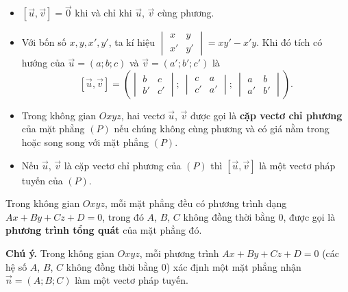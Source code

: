 \begin{chuy}
\begin{itemize}
  \item $[\vec u,\vec v]=\vec0$ khi và chỉ khi $\vec u$, $\vec v$ cùng phương.
  \item Với bốn số $x,y,x',y'$, ta kí hiệu $\begin{vmatrix}x&y\\x'&y'\end{vmatrix}=xy'-x'y$. Khi đó tích có hướng của $\vec u=(a;b;c)$ và $\vec v=(a';b';c')$ là
  \[[\vec u,\vec v]=\left(\begin{vmatrix}b&c\\b'&c'\end{vmatrix};\ \begin{vmatrix}c&a\\c'&a'\end{vmatrix};\ \begin{vmatrix}a&b\\a'&b'\end{vmatrix}\right).\]
\end{itemize}
\end{chuy}

\begin{dinhnghia}
\begin{itemize}
  \item Trong không gian $Oxyz$, hai vectơ $\vec u$, $\vec v$ được gọi là \textbf{cặp vectơ chỉ phương} của mặt phẳng $(P)$ nếu chúng không cùng phương và có giá nằm trong hoặc song song với mặt phẳng $(P)$.
  \item Nếu $\vec u$, $\vec v$ là cặp vectơ chỉ phương của $(P)$ thì $[\vec u,\vec v]$ là một vectơ pháp tuyến của $(P)$.
\end{itemize}
\end{dinhnghia}

\begin{dinhnghia}
Trong không gian $Oxyz$, mỗi mặt phẳng đều có phương trình dạng $Ax+By+Cz+D=0$, trong đó $A$, $B$, $C$ không đồng thời bằng $0$, được gọi là \textbf{phương trình tổng quát} của mặt phẳng đó.

\smallskip\textbf{\color{dcnhan}Chú ý.} Trong không gian $Oxyz$, mỗi phương trình $Ax+By+Cz+D=0$ (các hệ số $A$, $B$, $C$ không đồng thời bằng $0$) xác định một mặt phẳng nhận $\vec n=(A;B;C)$ làm một vectơ pháp tuyến.
\end{dinhnghia}

